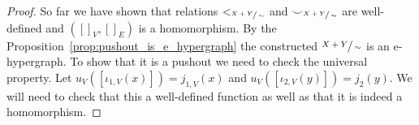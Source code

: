 \begin{proof}

    So far we have shown that relations $<_{\sfrac{X+Y}{\sim}}$ and ${\smile}_{\sfrac{X+Y}{\sim}}$ are well-defined and $([]_{V},[]_{E})$ is a homomorphism.
    By the Proposition~\ref{prop:pushout_is_e_hypergraph} the constructed $\sfrac{X+Y}{\sim}$ is an e-hypergraph.
    To show that it is a pushout we need to check the universal property.
    Let $u_{V}([\iota_{1,V}(x)]) = j_{1,V}(x)$ and $u_{V}([\iota_{2,V}(y)]) = j_2(y)$.
    We will need to check that this a well-defined function as well as that it is indeed a homomorphism.


\end{proof}
